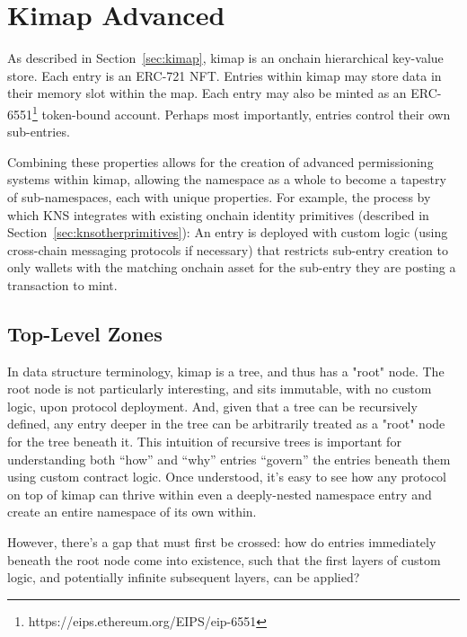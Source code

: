 \documentclass[runningheads]{llncs}
\begin{document}
\section{Kimap Advanced}
\label{sec:kimapadvanced}

As described in Section~\ref{sec:kimap}, kimap is an onchain hierarchical key-value store.
Each entry is an ERC-721 NFT.
Entries within kimap may store data in their memory slot within the map.
Each entry may also be minted as an ERC-6551\footnote{https://eips.ethereum.org/EIPS/eip-6551} token-bound account.
Perhaps most importantly, entries control their own sub-entries.

Combining these properties allows for the creation of advanced permissioning systems within kimap, allowing the namespace as a whole to become a tapestry of sub-namespaces, each with unique properties.
For example, the process by which KNS integrates with existing onchain identity primitives (described in Section~\ref{sec:knsotherprimitives}):
An entry is deployed with custom logic (using cross-chain messaging protocols if necessary) that restricts sub-entry creation to only wallets with the matching onchain asset for the sub-entry they are posting a transaction to mint.

\subsection{Top-Level Zones}

In data structure terminology, kimap is a tree, and thus has a "root" node.
The root node is not particularly interesting, and sits immutable, with no custom logic, upon protocol deployment.
And, given that a tree can be recursively defined, any entry deeper in the tree can be arbitrarily treated as a "root" node for the tree beneath it.
This intuition of recursive trees is important for understanding both ``how'' and ``why'' entries ``govern'' the entries beneath them using custom contract logic.
Once understood, it's easy to see how any protocol on top of kimap can thrive within even a deeply-nested namespace entry and create an entire namespace of its own within.

However, there's a gap that must first be crossed: how do entries immediately beneath the root node come into existence, such that the first layers of custom logic, and potentially infinite subsequent layers, can be applied?
\end{document}
